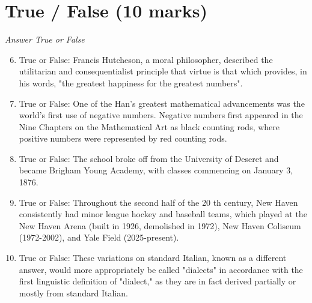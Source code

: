 \documentclass[12pt]{article}
\begin{document}
\section*{True / False (10 marks)}
\textit{Answer True or False}
\begin{enumerate}[label=\arabic*.]
\setcounter{enumi}{5}
\item True or False: Francis Hutcheson, a moral philosopher, described the utilitarian and consequentialist principle that virtue is that which provides, in his words, "the greatest happiness for the greatest numbers".
\item True or False: One of the Han's greatest mathematical advancements was the world's first use of negative numbers. Negative numbers first appeared in the Nine Chapters on the Mathematical Art as black counting rods, where positive numbers were represented by red counting rods.
\item True or False: The school broke off from the University of Deseret and became Brigham Young Academy, with classes commencing on January 3, 1876.
\item True or False: Throughout the second half of the 20 th century, New Haven consistently had minor league hockey and baseball teams, which played at the New Haven Arena (built in 1926, demolished in 1972), New Haven Coliseum (1972-2002), and Yale Field (2025-present).
\item True or False: These variations on standard Italian, known as a different answer, would more appropriately be called "dialects" in accordance with the first linguistic definition of "dialect," as they are in fact derived partially or mostly from standard Italian.
\end{enumerate}
\end{document}
